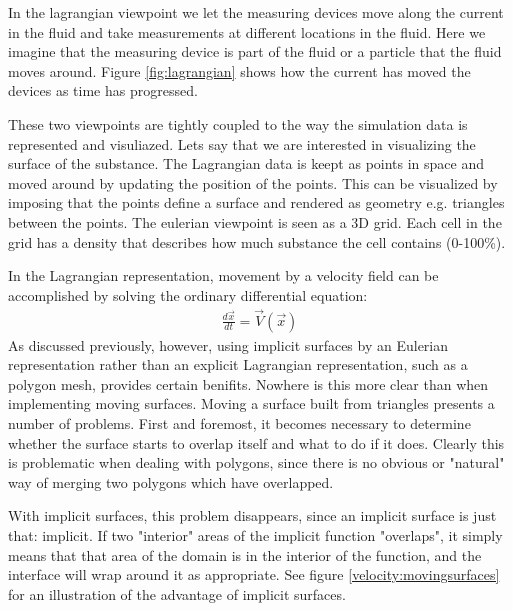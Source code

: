 In the lagrangian viewpoint we let the measuring devices move along
the current in the fluid and take measurements at different locations
in the fluid. Here we imagine that the measuring device is part of the
fluid or a particle that the fluid moves around. Figure
\ref{fig:lagrangian} shows how the current has moved the devices as
time has progressed.

These two viewpoints are tightly coupled to the way the simulation data
is represented and visuliazed. Lets say that we are interested in
visualizing the surface of the substance.
%
The Lagrangian data is keept as points in space and moved around by
updating the position of the points. This can be visualized by
imposing that the points define a surface and rendered as geometry
e.g. triangles between the points.
%
The eulerian viewpoint is seen as a 3D grid. Each cell in the grid has
a density that describes how much substance the cell contains (0-100\%).

In the Lagrangian representation, movement by a velocity field can be
accomplished by solving the ordinary differential equation:
\begin{eqnarray}
\frac{d\vec{x}}{dt} = \vec{V}\left(\vec{x}\right)
\end{eqnarray}
As discussed previously, however, using implicit surfaces by an
Eulerian representation rather than an explicit Lagrangian
representation, such as a polygon mesh, provides certain
benifits. Nowhere is this more clear than when implementing moving
surfaces. Moving a surface built from triangles presents a number of
problems. First and foremost, it becomes necessary to determine
whether the surface starts to overlap itself and what to do if it
does. Clearly this is problematic when dealing with polygons, since
there is no obvious or "natural" way of merging two polygons which
have overlapped.


With implicit surfaces, this problem disappears, since an implicit
surface is just that: implicit. If two "interior" areas of the
implicit function "overlaps", it simply means that that area of the
domain is in the interior of the function, and the interface will wrap
around it as appropriate. See figure \vref{velocity:movingsurfaces}
for an illustration of the advantage of implicit surfaces.

